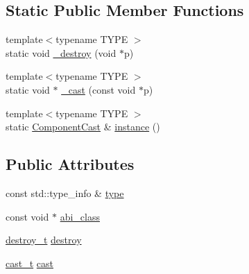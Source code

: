 \subsection*{Static Public Member Functions}
\begin{DoxyCompactItemize}
\item 
{\footnotesize template$<$typename TYPE $>$ }\\static void \hyperlink{class_d_d4hep_1_1_component_cast_ab2bb84f3ada8c005febcf8167ddc13bf}{\_\-destroy} (void $\ast$p)
\item 
{\footnotesize template$<$typename TYPE $>$ }\\static void $\ast$ \hyperlink{class_d_d4hep_1_1_component_cast_aec81a88f83f9f521a28779fc922c9656}{\_\-cast} (const void $\ast$p)
\item 
{\footnotesize template$<$typename TYPE $>$ }\\static \hyperlink{class_d_d4hep_1_1_component_cast}{ComponentCast} \& \hyperlink{class_d_d4hep_1_1_component_cast_a0bd14bc60af0175c7dad5164128cf030}{instance} ()
\end{DoxyCompactItemize}
\subsection*{Public Attributes}
\begin{DoxyCompactItemize}
\item 
const std::type\_\-info \& \hyperlink{class_d_d4hep_1_1_component_cast_a984d18ed863fe54855cf3308560270f0}{type}
\item 
const void $\ast$ \hyperlink{class_d_d4hep_1_1_component_cast_ae8cce3fcc69745f330272a49d51024dd}{abi\_\-class}
\item 
\hyperlink{class_d_d4hep_1_1_component_cast_a60cfc51ff4c1b324e86c3f6b4bf4ba55}{destroy\_\-t} \hyperlink{class_d_d4hep_1_1_component_cast_af161de076d882540309e24d86ef50137}{destroy}
\item 
\hyperlink{class_d_d4hep_1_1_component_cast_a8d1ee595a10ab3382d1c7dc1b8987c1f}{cast\_\-t} \hyperlink{class_d_d4hep_1_1_component_cast_a2f6cd06755e613e3f02c5302361d7024}{cast}
\end{DoxyCompactItemize}
